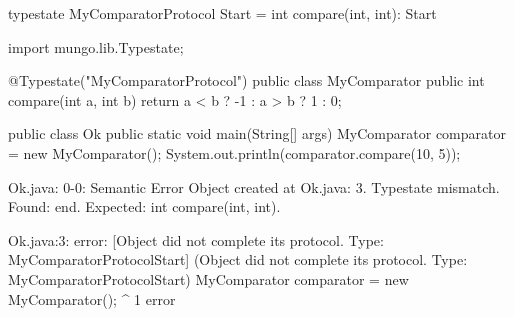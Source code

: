 \begin{code}
typestate MyComparatorProtocol {
  Start = {
    int compare(int, int): Start
  }
}\end{code}

\begin{code}
import mungo.lib.Typestate;

@Typestate("MyComparatorProtocol")
public class MyComparator {
  public int compare(int a, int b) {
    return a < b ? -1 : a > b ? 1 : 0;
  }
}\end{code}

\begin{code}
public class Ok {
	public static void main(String[] args) {
		MyComparator comparator = new MyComparator();
    System.out.println(comparator.compare(10, 5));
	}
}\end{code}

\lstset{language=,caption=Original Mungo output}
\begin{code}

Ok.java: 0-0: Semantic Error
		Object created at Ok.java: 3. Typestate mismatch. Found: end. Expected: int compare(int, int).
\end{code}

\lstset{language=,caption=New Mungo output}
\begin{code}
Ok.java:3: error: [Object did not complete its protocol. Type: MyComparatorProtocol{Start}] (Object did not complete its protocol. Type: MyComparatorProtocol{Start})
		MyComparator comparator = new MyComparator();
		             ^
1 error
\end{code}

